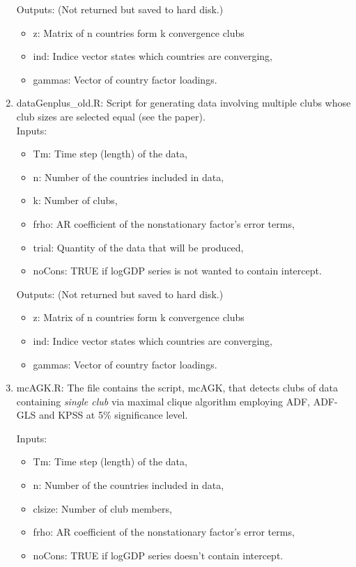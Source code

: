 \documentclass{article}
\begin{document}
\begin{enumerate}
	Outputs: (Not returned but saved to hard disk.)
	
	\begin{itemize}
		\item  z: Matrix of n countries form k convergence clubs
		\item  ind: Indice vector states which countries are converging,
		\item  gammas:  Vector of country factor loadings.  
	\end{itemize}		 
	\item dataGenplus\_old.R: Script for generating data involving multiple clubs whose club sizes are selected equal (see the paper). \\

Inputs:
\begin{itemize}
	
	\item Tm: Time step (length) of the data,
	\item n: Number of the countries included in data,
	\item k: Number of clubs, 
	\item frho: AR coefficient of the nonstationary factor's error terms,
	\item trial: Quantity of the data that will be produced,
	\item noCons: TRUE if logGDP series is not wanted to contain intercept.
\end{itemize}

Outputs: (Not returned but saved to hard disk.)

\begin{itemize}
	\item  z: Matrix of n countries form k convergence clubs
	\item  ind: Indice vector states which countries are converging,
	\item  gammas:  Vector of country factor loadings.  
\end{itemize}
		 
	\item mcAGK.R: The file contains the script, mcAGK, that detects clubs of data containing \textit{single club} via maximal clique algorithm employing ADF, ADF-GLS and KPSS at 5\% significance level.
	
		Inputs:
		\begin{itemize}
			
			\item Tm: Time step (length) of the data,
			\item n: Number of the countries included in data,
			\item clsize: Number of club members, 
			\item frho: AR coefficient of the nonstationary factor's error terms,
			\item noCons: TRUE if logGDP series doesn't contain intercept.
		\end{itemize}
		

\end{enumerate}
\end{document}

